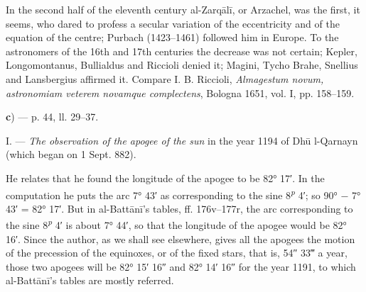 \documentclass[11pt]{article}
\begin{document}
\addtocounter{footnote}{-1}
\par In the second half of the eleventh century al-Zarqālī, or Arzachel, was the first, it seems, who dared to profess a secular variation of the eccentricity and of the equation of the centre; Purbach (1423–1461) followed him in Europe. To the astronomers of the 16th and 17th centuries the decrease was not certain; Kepler, Longomontanus, Bullialdus and Riccioli denied it; Magini, Tycho Brahe, Snellius and Lansbergius affirmed it. Compare I. B. Riccioli, \emph{Almagestum novum, astronomiam veterem novamque complectens}, Bologna 1651, vol. I, pp. 158–159.\par
\par\begin{center}\textbf{c}) — p. 44, ll. 29–37.\end{center}
\par I. — \emph{The observation of the apogee of the sun} in the year 1194 of Dhū l-Qarnayn (which began on 1 Sept. 882).\par
\par He relates that he found the longitude of the apogee to be 82° 17′. In the computation he puts the arc 7° 43′ as corresponding to the sine 8\textsuperscript{\itshape p} 4′; so 90° − 7° 43′ = 82° 17′. But in al-Battānī's tables, ff. 176v–177r, the arc corresponding to the sine 8\textsuperscript{\itshape p} 4′ is about 7° 44′, so that the longitude of the apogee would be 82° 16′. Since the author, as we shall see elsewhere, gives all the apogees the motion of the precession of the equinoxes, or of the fixed stars, that is, 54″ 33‴ a year, those two apogees will be 82° 15′ 16″ and 82° 14′ 16″ for the year 1191, to which al-Battānī's tables are mostly referred.\par
\end{document}
